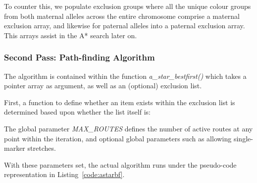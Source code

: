 \begin{enumerate}
{To counter this, we populate exclusion groups where all the unique colour groups from both maternal alleles across the entire chromosome comprise a maternal exclusion array, and likewise for paternal alleles into a paternal exclusion array. This arrays assist in the A* search later on.}

\end{enumerate}

\subsubsection*{Second Pass: Path-finding Algorithm}

The algorithm is contained within the function \textit{a\_star\_bestfirst()} which takes a pointer array as argument, as well as an (optional) exclusion list.

First, a function to define whether an item exists within the exclusion list is determined based upon whether the list itself is:
\begin{enumerate}[label=(\alph*)]
\end{enumerate}

The global parameter \textit{MAX\_ROUTES}  defines the number of active routes at any point within the iteration, and optional global parameters such as allowing single-marker stretches.

With these parameters set, the actual algorithm runs under the pseudo-code representation in Listing~\ref{code:astarbf}. 

